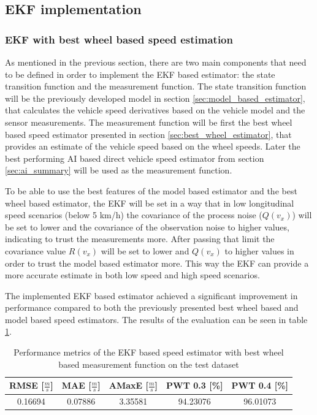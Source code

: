 \subsection{EKF implementation}

\subsubsection{EKF with best wheel based speed estimation}

As mentioned in the previous section, there are two main components that need to be defined in order to implement the EKF based estimator: the state transition function and the measurement function. The state transition function will be the previously developed model in section \ref{sec:model_based_estimator}, that calculates the vehicle speed derivatives based on the vehicle model and the sensor measurements. The measurement function will be first the best wheel based speed estimator presented in section \ref{sec:best_wheel_estimator}, that provides an estimate of the vehicle speed based on the wheel speeds. Later the best performing AI based direct vehicle speed estimator from section \ref{sec:ai_summary} will be used as the measurement function. 

To be able to use the best features of the model based estimator and the best wheel based estimator, the EKF will be set in a way that in low longitudinal speed scenarios (below 5 km/h) the covariance of the process noise ($Q(v_x)$) will be set to lower and the covariance of the observation noise to higher values, indicating to trust the measurements more. After passing that limit the covariance value $R(v_x)$ will be set to lower and $Q(v_x)$ to higher values in order to trust the model based estimator more. This way the EKF can provide a more accurate estimate in both low speed and high speed scenarios. 

The implemented EKF based estimator achieved a significant improvement in performance compared to both the previously presented best wheel based and model based speed estimators. The results of the evaluation can be seen in table \ref{tab:ekf_best_wheel_results}.

\FloatBarrier
\begin{table}[h]
    \centering
    \begin{tabular}{|c|c|c|c|c|}
        \hline
        \textbf{RMSE [$\frac{m}{s}$]} & \textbf{MAE [$\frac{m}{s}$]} & \textbf{AMaxE [$\frac{m}{s}$]} & \textbf{PWT 0.3 [\%]} & \textbf{PWT 0.4 [\%]} \\
        \hline \hline
        0.16694 & 0.07886 & 3.35581 & 94.23076 & 96.01073 \\
        \hline
    \end{tabular}
    \caption{Performance metrics of the EKF based speed estimator with best wheel based measurement function on the test dataset}
    \label{tab:ekf_best_wheel_results}
\end{table}
\FloatBarrier

